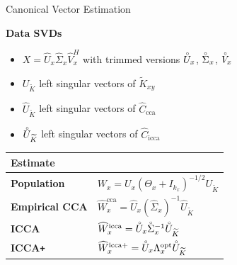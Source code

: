 \documentclass[8pt]{beamer}
\newcommand{\Ux}{U_x}
\newcommand{\kx}{k_x}
\newcommand{\Uxhat}{\widehat{U}_x}
\newcommand{\Sigxhat}{\widehat{\Sigma}_x}
\newcommand{\Vxhat}{\widehat{V}_x}
\newcommand{\Uxcir}{\accentset{\circ}{U}_x}
\newcommand{\Ukcir}{\accentset{\circ}{U}_{\widetilde{K}}}
\newcommand{\Sigxcir}{\accentset{\circ}{\Sigma}_x}
\newcommand{\Vxcir}{\accentset{\circ}{V}_x}
\newcommand{\Tx}{\Theta_x}
\newcommand{\Kxytil}{\widetilde{K}_{xy}}
\newcommand{\Uktil}{U_{\widetilde{K}}}
\newcommand{\Cccahat}{\widehat{C}_{\text{cca}}}
\newcommand{\Ciccahat}{\widehat{C}_{\text{icca}}}
\newcommand{\iccap}{ICCA\texttt{+} }
\begin{document}
\begin{frame}{Canonical Vector Estimation}

\textbf{Data SVDs}
\begin{itemize}
\item $X=\Uxhat\Sigxhat\Vxhat^H$ with trimmed versions $\Uxcir$, $\Sigxcir$, $\Vxcir$
\item $\Uktil$ left singular vectors of $\Kxytil$
\item $\widehat{U}_{\widetilde{K}}$ left singular vectors of $\Cccahat$
\item $\Ukcir$ left singular vectors of $\Ciccahat$
\end{itemize}

\vspace{3ex}

\begin{table}[t]
\centering
\begin{tabular}{l|l}\toprule
Estimate & \\
\midrule
\textbf{Population}  & $W_x = \Ux\left(\Tx + I_{\kx}\right)^{-1/2}\Uktil$\\[1ex]
\textbf{Empirical CCA} & $\widehat{W}_x^{\text{cca}} =
\Uxhat\left(\Sigxhat\right)^{-1}\widehat{U}_{\widetilde{K}}$\\[1ex]
\textbf{ICCA} & $\widehat{W}_x^{\text{icca}} = \Uxcir\Sigxcir^{-1}\Ukcir$\\[1ex]
\textbf{\iccap} &$\widehat{W}_x^{\text{icca+}} = \Uxcir\Lambda_x^{\text{opt}}\Ukcir$\\[1ex]
\bottomrule
\end{tabular}
\end{table}

\end{frame}
\end{document}
